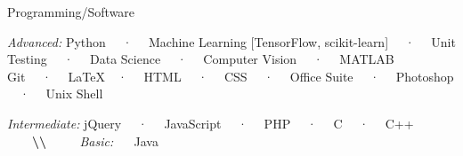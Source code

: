 \begin{cventries}
  \cventry
    {Programming/Software}
    {}
    {}
    {}
    {
      \begin{cvitems}
        \item {\textit{Advanced:} Python ~~·~~ Machine Learning [TensorFlow, scikit-learn] ~~·~~ Unit Testing ~~·~~ Data Science ~~·~~ Computer Vision ~~·~~ MATLAB \\ Git ~~·~~ \LaTeX ~~·~~ HTML  ~~·~~  CSS ~~·~~ Office Suite ~~·~~ Photoshop ~~·~~ Unix Shell}
        \item {\textit{Intermediate:} jQuery ~~·~~ JavaScript ~~·~~ PHP ~~·~~ C ~~·~~ C++ ~~~~{\color{black!30}\textbf{\textbackslash\textbackslash}} ~~~~ \textit{Basic:} ~~ Java}
      \end{cvitems}
    }
    
\end{cventries}
